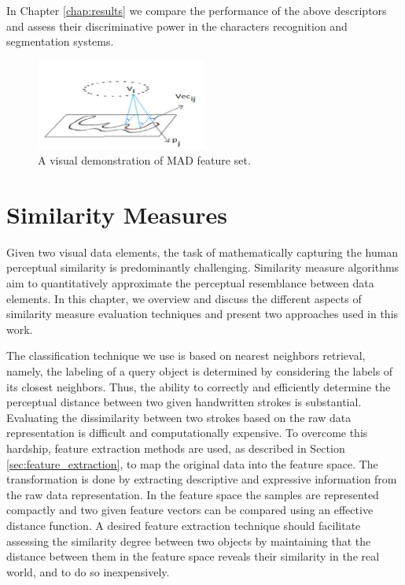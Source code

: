 In Chapter \ref{chap:results} we compare the performance of the above descriptors and assess their discriminative power in the characters recognition and segmentation systems. 

\begin{figure}[h]
\centering
\includegraphics[width=0.5\textwidth]{./figures/mad_demo}       
\caption{A visual demonstration of MAD feature set.}
\label{fig:mad_demo}
\end{figure}
\newpage{}

\section{Similarity Measures}
\label{sec:similarity_measures}

\iftoggle{edit-mode}{\hspace{0pt}\marginpar{Introduction}}{}
Given two visual data elements, the task of mathematically capturing the human perceptual similarity is predominantly challenging. Similarity measure algorithms aim to quantitatively approximate the perceptual resemblance between data elements. In this chapter, we overview and discuss the different aspects of similarity measure evaluation techniques and present two approaches used in this work.

\iftoggle{edit-mode}{\hspace{0pt}\marginpar{Intuition}}{}
The classification technique we use is based on nearest neighbors retrieval, namely, the labeling of a query object is determined by considering the labels of its closest neighbors. Thus, the ability to correctly and efficiently determine the perceptual distance between two given handwritten strokes is  substantial. Evaluating the dissimilarity between two strokes based on the raw data representation is difficult and computationally expensive. To overcome this hardship, feature extraction methods are used, as described in Section \ref{sec:feature_extraction}, to map the original data into the feature space. The transformation is done by extracting descriptive and expressive information from the raw data representation. In the feature space the samples are represented compactly and two given feature vectors can be compared using an effective distance function. A desired feature extraction technique should facilitate assessing the similarity degree between two objects by maintaining that the distance between them in the feature space reveals their similarity in the real world, and to do so inexpensively. 

